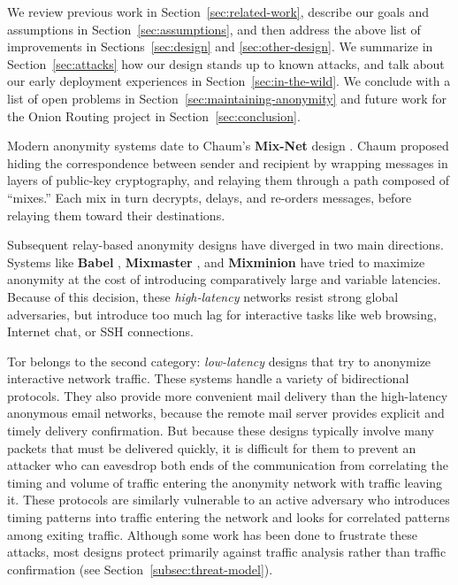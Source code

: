 \documentclass[times,10pt,twocolumn]{article}
\begin{document}
We review previous work in Section~\ref{sec:related-work}, describe
our goals and assumptions in Section~\ref{sec:assumptions},
and then address the above list of improvements in
Sections~\ref{sec:design} and \ref{sec:other-design}. We summarize
in Section~\ref{sec:attacks} how our design stands up to
known attacks, and talk about our early deployment experiences in
Section~\ref{sec:in-the-wild}. We conclude with a list of open problems in
Section~\ref{sec:maintaining-anonymity} and future work for the Onion
Routing project in Section~\ref{sec:conclusion}.


\label{sec:related-work}

Modern anonymity systems date to Chaum's {\bf Mix-Net} design
\cite{chaum-mix}. Chaum
proposed hiding the correspondence between sender and recipient by
wrapping messages in layers of public-key cryptography, and relaying them
through a path composed of ``mixes.''  Each mix in turn
decrypts, delays, and re-orders messages, before relaying them toward
their destinations.

Subsequent relay-based anonymity designs have diverged in two
main directions. Systems like {\bf Babel} \cite{babel}, {\bf Mixmaster}
\cite{mixmaster-spec}, and {\bf Mixminion} \cite{minion-design} have tried
to maximize anonymity at the cost of introducing comparatively large and
variable latencies. Because of this decision, these \emph{high-latency}
networks resist strong global adversaries,
but introduce too much lag for interactive tasks like web browsing,
Internet chat, or SSH connections.

Tor belongs to the second category: \emph{low-latency} designs that
try to anonymize interactive network traffic. These systems handle
a variety of bidirectional protocols. They also provide more convenient
mail delivery than the high-latency anonymous email
networks, because the remote mail server provides explicit and timely
delivery confirmation. But because these designs typically
involve many packets that must be delivered quickly, it is
difficult for them to prevent an attacker who can eavesdrop both ends of the
communication from correlating the timing and volume
of traffic entering the anonymity network with traffic leaving it.  These
protocols are similarly vulnerable to an active adversary who introduces
timing patterns into traffic entering the network and looks
for correlated patterns among exiting traffic.
Although some work has been done to frustrate
these attacks, %
 most designs protect primarily against traffic analysis rather than traffic
confirmation (see Section~\ref{subsec:threat-model}).
\end{document}

